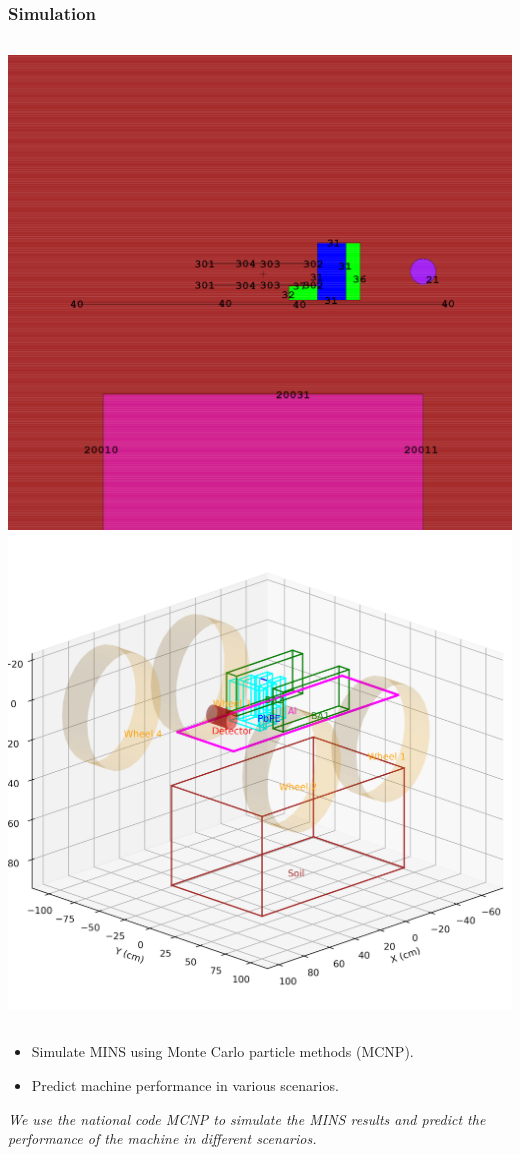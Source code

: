 \documentclass[notheorems,11pt,compress]{beamer}
\begin{document}
\begin{frame}
\frametitle{Simulation}
\begin{columns}
\includegraphics[width=\linewidth]{minsinmcnp.png}
\includegraphics[width=\linewidth]{minsin3d.png}
\end{columns}
\vspace{1em}
\begin{itemize}
    \item Simulate MINS using Monte Carlo particle methods (MCNP).
    \item Predict machine performance in various scenarios.
\end{itemize}
\small
\textit{We use the national code MCNP to simulate the MINS results and predict the performance of the machine in different scenarios.}
\end{frame}
\end{document}
